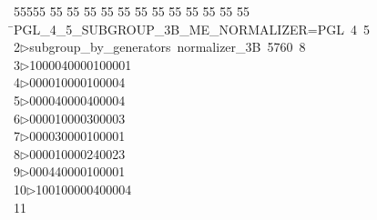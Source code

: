 %
%
\begin{tabbing}
55555 \= 55 \= 55 \= 55 \= 55 \= 55 \= 55 \= 55 \= 55 \= 55 \= 55 \= 55 \= 55 \= \>PGL\_4\_5\_SUBGROUP\_3B\_ME\_NORMALIZER=PGL\ 4\ 5\ \\[0pt]
2\>$\triangleright$\>subgroup\_by\_generators\ normalizer\_3B\ 5760\ 8\ \\[0pt]
3\>$\triangleright$\>1000040000100001\ \\[0pt]
4\>$\triangleright$000010000100004\ \\[0pt]
5\>$\triangleright$000040000400004\ \\[0pt]
6\>$\triangleright$000010000300003\ \\[0pt]
7\>$\triangleright$000030000100001\ \\[0pt]
8\>$\triangleright$000010000240023\ \\[0pt]
9\>$\triangleright$000440000100001\ \\[0pt]
10\>$\triangleright$100100000400004\ \\[0pt]
11\>\end{tabbing}
